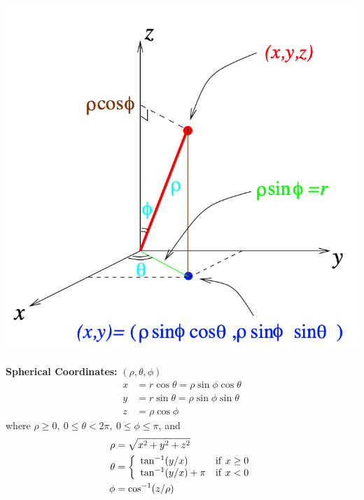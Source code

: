 \begin{spacing}{1.3}
\begin{center}
        \includegraphics[scale=0.4]{images/Ch10-spherical-coor.png}
    \end{center}

    {\bf Spherical Coordinates: } $(\rho, \theta,\phi)$
    \begin{align*}
        x &= r\cos\theta=\rho\sin\phi\cos\theta\\
        y &= r\sin\theta=\rho\sin\phi\sin\theta\\
        z &= \rho\cos\phi
    \end{align*}
    where $\rho\ge 0,\ 0\le \theta<2\pi,\ 0\le \phi\le \pi$, and 
    \begin{align*}
        \rho &= \sqrt{x^2+y^2+z^2}\\
        \theta &= \left\{ \begin{array}{ll}
            \tan^{-1}(y/x) & {\rm if}\ x\ge 0\\
            \tan^{-1}(y/x)+\pi & {\rm if}\ x<0
        \end{array}\right.\\
        \phi &= \cos^{-1}(z/\rho)
    \end{align*}
\end{spacing}
